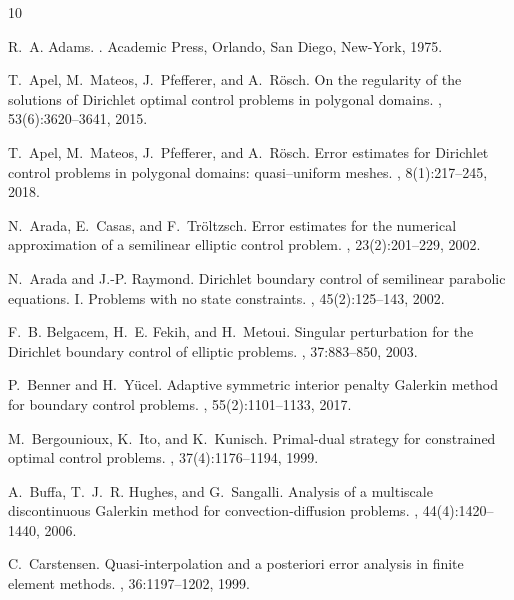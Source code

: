 \documentclass[a4paper,10pt]{article}
\numberwithin{theorem}{section}
\begin{document}
\begin{thebibliography}{10}

R.~A. Adams.
.
\newblock Academic Press, Orlando, San Diego, New-York, 1975.

T.~Apel, M.~Mateos, J.~Pfefferer, and A.~R\"osch.
\newblock On the regularity of the solutions of {D}irichlet optimal control
  problems in polygonal domains.
, 53(6):3620--3641, 2015.

T.~Apel, M.~Mateos, J.~Pfefferer, and A.~R\"osch.
\newblock Error estimates for {D}irichlet control problems in polygonal
  domains: quasi--uniform meshes.
, 8(1):217--245, 2018.

N.~Arada, E.~Casas, and F.~Tr{\"o}ltzsch.
\newblock Error estimates for the numerical approximation of a semilinear
  elliptic control problem.
, 23(2):201--229, 2002.

N.~Arada and J.-P. Raymond.
\newblock Dirichlet boundary control of semilinear parabolic equations. {I}.
  {P}roblems with no state constraints.
, 45(2):125--143, 2002.

F.~B. Belgacem, H.~E. Fekih, and H.~Metoui.
\newblock Singular perturbation for the {D}irichlet boundary control of
  elliptic problems.
, 37:883--850, 2003.

P.~Benner and H.~Y\"ucel.
\newblock Adaptive symmetric interior penalty {G}alerkin method for boundary
  control problems.
, 55(2):1101--1133, 2017.

M.~Bergounioux, K.~Ito, and K.~Kunisch.
\newblock Primal-dual strategy for constrained optimal control problems.
, 37(4):1176--1194, 1999.

A.~Buffa, T.~J.~R. Hughes, and G.~Sangalli.
\newblock Analysis of a multiscale discontinuous {G}alerkin method for
  convection-diffusion problems.
, 44(4):1420--1440, 2006.

C.~Carstensen.
\newblock Quasi-interpolation and a posteriori error analysis in finite element
  methods.
, 36:1197--1202, 1999.


\end{thebibliography}
\end{document}
